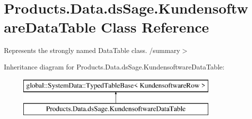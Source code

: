 \hypertarget{class_products_1_1_data_1_1ds_sage_1_1_kundensoftware_data_table}{}\section{Products.\+Data.\+ds\+Sage.\+Kundensoftware\+Data\+Table Class Reference}
\label{class_products_1_1_data_1_1ds_sage_1_1_kundensoftware_data_table}


Represents the strongly named Data\+Table class. /summary$>$  


Inheritance diagram for Products.\+Data.\+ds\+Sage.\+Kundensoftware\+Data\+Table\+:\begin{figure}[H]
\begin{center}
\leavevmode
\includegraphics[height=2.000000cm]{class_products_1_1_data_1_1ds_sage_1_1_kundensoftware_data_table}
\end{center}
\end{figure}
